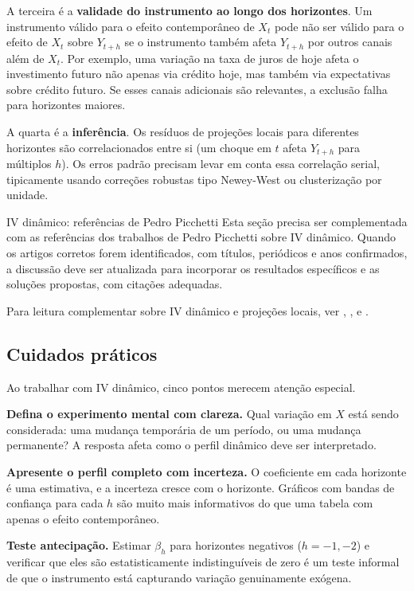 A terceira é a \textbf{validade do instrumento ao longo dos horizontes}. Um instrumento válido para o efeito contemporâneo de $X_t$ pode não ser válido para o efeito de $X_t$ sobre $Y_{t+h}$ se o instrumento também afeta $Y_{t+h}$ por outros canais além de $X_t$. Por exemplo, uma variação na taxa de juros de hoje afeta o investimento futuro não apenas via crédito hoje, mas também via expectativas sobre crédito futuro. Se esses canais adicionais são relevantes, a exclusão falha para horizontes maiores.

A quarta é a \textbf{inferência}. Os resíduos de projeções locais para diferentes horizontes são correlacionados entre si (um choque em $t$ afeta $Y_{t+h}$ para múltiplos $h$). Os erros padrão precisam levar em conta essa correlação serial, tipicamente usando correções robustas tipo Newey-West ou clusterização por unidade.

\begin{todo}{IV dinâmico: referências de Pedro Picchetti}
Esta seção precisa ser complementada com as referências dos trabalhos de Pedro Picchetti sobre IV dinâmico. Quando os artigos corretos forem identificados, com títulos, periódicos e anos confirmados, a discussão deve ser atualizada para incorporar os resultados específicos e as soluções propostas, com citações adequadas.

Para leitura complementar sobre IV dinâmico e projeções locais, ver \citet{Jorda2005}, \citet{PlagborgMollerWolf2021}, \citet{StockWatson2018} e \citet{Ramey2016}.
\end{todo}

\subsection*{Cuidados práticos}

Ao trabalhar com IV dinâmico, cinco pontos merecem atenção especial.

\textbf{Defina o experimento mental com clareza.} Qual variação em $X$ está sendo considerada: uma mudança temporária de um período, ou uma mudança permanente? A resposta afeta como o perfil dinâmico deve ser interpretado.

\textbf{Apresente o perfil completo com incerteza.} O coeficiente em cada horizonte é uma estimativa, e a incerteza cresce com o horizonte. Gráficos com bandas de confiança para cada $h$ são muito mais informativos do que uma tabela com apenas o efeito contemporâneo.

\textbf{Teste antecipação.} Estimar $\beta_h$ para horizontes negativos ($h = -1, -2$) e verificar que eles são estatisticamente indistinguíveis de zero é um teste informal de que o instrumento está capturando variação genuinamente exógena.

